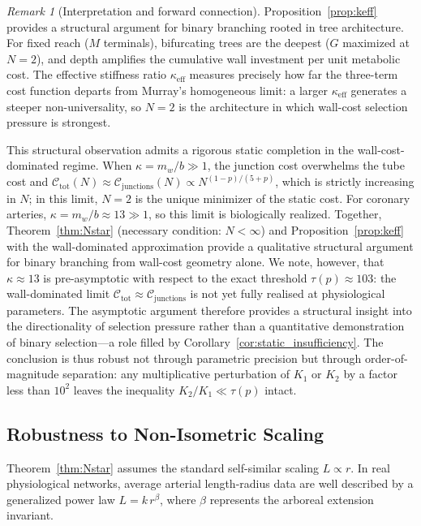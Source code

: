 \documentclass[11pt,a4paper]{article}
\theoremstyle{remark}
\newtheorem{remark}{Remark}
\begin{document}
\begin{remark}[Interpretation and forward connection]
Proposition~\ref{prop:keff} provides a structural argument for binary branching
rooted in tree architecture. For fixed reach ($M$ terminals), bifurcating trees
are the deepest ($G$ maximized at $N=2$), and depth amplifies the cumulative
wall investment per unit metabolic cost. The effective stiffness ratio
$\kappa_{\mathrm{eff}}$ measures precisely how far the three-term cost function
departs from Murray's homogeneous limit: a larger $\kappa_{\mathrm{eff}}$
generates a steeper non-universality, so $N=2$ is the architecture in which
wall-cost selection pressure is strongest.

\medskip
This structural observation admits a rigorous static completion in the
wall-cost-dominated regime. When $\kappa = m_w/b \gg 1$, the junction cost
overwhelms the tube cost and $\mathcal{C}_{\mathrm{tot}}(N) \approx
\mathcal{C}_{\mathrm{junctions}}(N) \propto N^{(1-p)/(5+p)}$, which is strictly
increasing in $N$; in this limit, $N=2$ is the unique minimizer of the static
cost. For coronary arteries, $\kappa = m_w/b \approx 13 \gg 1$, so this limit is
biologically realized. Together, Theorem~\ref{thm:Nstar} (necessary condition: $N < \infty$)
and Proposition~\ref{prop:keff} with the wall-dominated approximation
provide a qualitative structural argument for binary branching from
wall-cost geometry alone. We note, however, that $\kappa \approx 13$
is pre-asymptotic with respect to the exact threshold $\tau(p) \approx
103$: the wall-dominated limit $\mathcal{C}_{\mathrm{tot}} \approx
\mathcal{C}_{\mathrm{junctions}}$ is not yet fully realised at
physiological parameters. The asymptotic argument therefore provides
a structural insight into the directionality of selection pressure
rather than a quantitative demonstration of binary selection---a role
filled by Corollary~\ref{cor:static_insufficiency}. The conclusion
is thus robust not through parametric precision but through
order-of-magnitude separation: any multiplicative perturbation of
$K_1$ or $K_2$ by a factor less than $10^2$ leaves the inequality
$K_2/K_1 \ll \tau(p)$ intact.
\end{remark}

\subsection{Robustness to Non-Isometric Scaling}
\label{sec:non-isometric}
Theorem~\ref{thm:Nstar} assumes the standard self-similar scaling $L \propto r$.
In real physiological networks, average arterial length-radius data are well
described by a generalized power law $L = k\,r^\beta$, where $\beta$ represents
the arboreal extension invariant.
\end{document}
